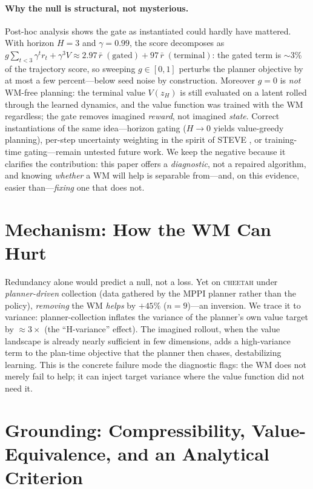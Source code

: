 \documentclass[letterpaper]{article}
\begin{document}
\paragraph{Why the null is structural, not mysterious.}
Post-hoc analysis shows the gate as instantiated could hardly have mattered.
With horizon $H{=}3$ and $\gamma{=}0.99$, the score decomposes as
$g\sum_{t<3}\gamma^t r_t + \gamma^3 V \approx 2.97\,\bar r\;(\text{gated}) +
97\,\bar r\;(\text{terminal})$: the gated term is $\sim$3\% of the trajectory
score, so sweeping $g\in[0,1]$ perturbs the planner objective by at most a few
percent---below seed noise by construction. Moreover $g{=}0$ is \emph{not}
WM-free planning: the terminal value $V(z_H)$ is still evaluated on a latent
rolled through the learned dynamics, and the value function was trained with
the WM regardless; the gate removes imagined \emph{reward}, not imagined
\emph{state}. Correct instantiations of the same idea---horizon gating
($H\!\to\!0$ yields value-greedy planning), per-step uncertainty weighting in
the spirit of STEVE \cite{buckman2018steve}, or training-time gating---remain
untested future work. We keep the negative because it clarifies the
contribution: this paper offers a \emph{diagnostic}, not a repaired algorithm,
and knowing \emph{whether} a WM will help is separable from---and, on this
evidence, easier than---\emph{fixing} one that does not.

\section{Mechanism: How the WM Can Hurt}
\label{sec:mechanism}
Redundancy alone would predict a null, not a loss. Yet on \textsc{cheetah}
under \emph{planner-driven} collection (data gathered by the MPPI planner
rather than the policy), \emph{removing} the WM \emph{helps} by $+45\%$
($n{=}9$)---an inversion. We trace it to variance: planner-collection inflates
the variance of the planner's own value target by $\approx 3\times$ (the
``H-variance'' effect). The imagined rollout, when the value landscape is
already nearly sufficient in few dimensions, adds a high-variance term to the
plan-time objective that the planner then chases, destabilizing learning.
This is the concrete failure mode the diagnostic flags: the WM does not merely
fail to help; it can inject target variance where the value function did not
need it.

\section{Grounding: Compressibility, Value-Equivalence, and an Analytical Criterion}
\label{sec:theory}
\end{document}
